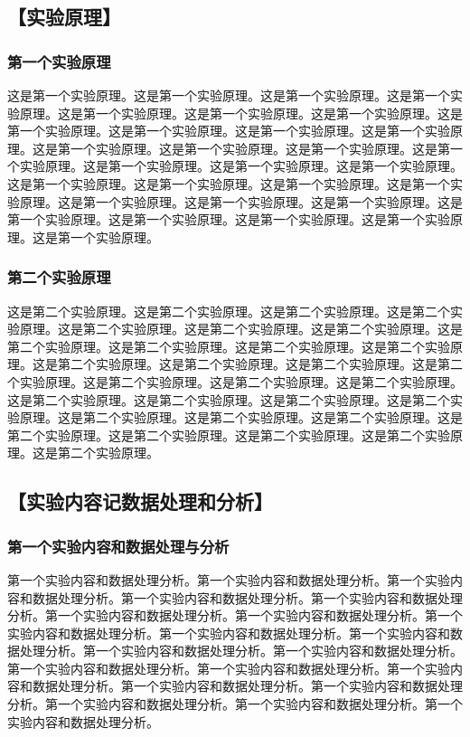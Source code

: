 \documentclass[a4paper,c5size,twoside,UTF8]{ctexart} %
\begin{document}

\subsection{【实验原理】}
\subsubsection{第一个实验原理}
这是第一个实验原理。这是第一个实验原理。这是第一个实验原理。这是第一个实验原理。这是第一个实验原理。这是第一个实验原理。这是第一个实验原理。这是第一个实验原理。这是第一个实验原理。这是第一个实验原理。这是第一个实验原理。这是第一个实验原理。这是第一个实验原理。这是第一个实验原理。这是第一个实验原理。这是第一个实验原理。这是第一个实验原理。这是第一个实验原理。这是第一个实验原理。这是第一个实验原理。这是第一个实验原理。这是第一个实验原理。这是第一个实验原理。这是第一个实验原理。这是第一个实验原理。这是第一个实验原理。这是第一个实验原理。这是第一个实验原理。这是第一个实验原理。这是第一个实验原理。

\subsubsection{第二个实验原理}
这是第二个实验原理。这是第二个实验原理。这是第二个实验原理。这是第二个实验原理。这是第二个实验原理。这是第二个实验原理。这是第二个实验原理。这是第二个实验原理。这是第二个实验原理。这是第二个实验原理。这是第二个实验原理。这是第二个实验原理。这是第二个实验原理。这是第二个实验原理。这是第二个实验原理。这是第二个实验原理。这是第二个实验原理。这是第二个实验原理。这是第二个实验原理。这是第二个实验原理。这是第二个实验原理。这是第二个实验原理。这是第二个实验原理。这是第二个实验原理。这是第二个实验原理。这是第二个实验原理。这是第二个实验原理。这是第二个实验原理。这是第二个实验原理。这是第二个实验原理。

\subsection{【实验内容记数据处理和分析】}
\subsubsection{第一个实验内容和数据处理与分析}
第一个实验内容和数据处理分析。第一个实验内容和数据处理分析。第一个实验内容和数据处理分析。第一个实验内容和数据处理分析。第一个实验内容和数据处理分析。第一个实验内容和数据处理分析。第一个实验内容和数据处理分析。第一个实验内容和数据处理分析。第一个实验内容和数据处理分析。第一个实验内容和数据处理分析。第一个实验内容和数据处理分析。第一个实验内容和数据处理分析。第一个实验内容和数据处理分析。第一个实验内容和数据处理分析。第一个实验内容和数据处理分析。第一个实验内容和数据处理分析。第一个实验内容和数据处理分析。第一个实验内容和数据处理分析。第一个实验内容和数据处理分析。第一个实验内容和数据处理分析。
\end{document}
